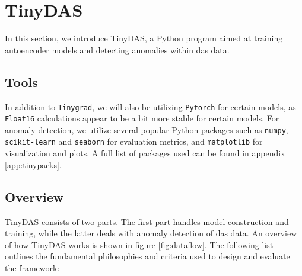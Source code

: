 \section{TinyDAS}

In this section, we introduce TinyDAS, a Python program aimed at training autoencoder models and detecting anomalies within \acrshort{das} data. 

\subsection{Tools}

In addition to \texttt{Tinygrad}, we will also be utilizing \texttt{Pytorch} for certain models, as \texttt{Float16} calculations appear to be a bit more stable for certain models. For anomaly detection, we utilize several popular Python packages such as \texttt{numpy}, \texttt{scikit-learn} and \texttt{seaborn} for evaluation metrics, and \texttt{matplotlib} for visualization and plots. A full list of packages used can be found in 
appendix \ref{app:tinypacks}.


\subsection{Overview}
\label{meth:tinyoverview}

TinyDAS consists of two parts. The first part handles model construction and training, while the latter deals with anomaly detection of \acrshort{das} data. An overview of how TinyDAS works is shown in figure \ref{fig:dataflow}. The following list outlines the fundamental philosophies and criteria used to design and evaluate the framework:

